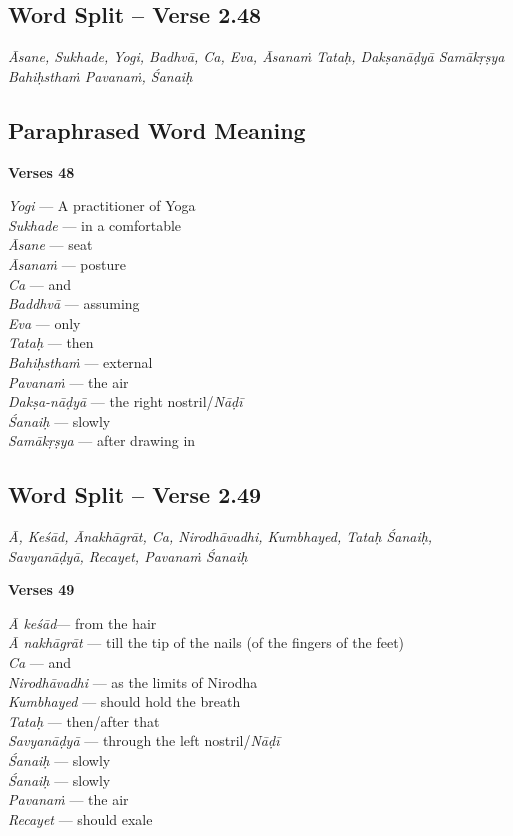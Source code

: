 \subsection*{Word Split -- Verse 2.48}

\textit{Āsane, Sukhade, Yogi, Badhvā, Ca, Eva, Āsanaṁ Tataḥ, Dakṣanāḍyā Samākṛṣya Bahiḥsthaṁ Pavanaṁ, Śanaiḥ}

\subsection*{Paraphrased Word Meaning}


\noindent \textbf{Verses 48}

\begin{multicols}{2}
\textit{Yogi} --- A practitioner of Yoga \\
\textit{Sukhade} --- in a comfortable \\
\textit{Āsane} --- seat \\
\textit{Āsanaṁ} --- posture  \\
\textit{Ca} --- and \\
\textit{Baddhvā} --- assuming\\
\textit{Eva} --- only\\
\textit{Tataḥ} --- then\\ 
\textit{Bahiḥsthaṁ} --- external\\
\textit{Pavanaṁ} --- the air \\
\textit{Dakṣa-nāḍyā} --- the right nostril/\textit{Nāḍī}\\
\textit{Śanaiḥ} --- slowly \\
\textit{Samākṛṣya} --- after drawing in
\end{multicols}

\subsection*{Word Split – Verse 2.49}

\textit{Ā, Keśād, Ānakhāgrāt, Ca, Nirodhāvadhi, Kumbhayed, Tataḥ Śanaiḥ, Savyanāḍyā, Recayet, Pavanaṁ Śanaiḥ}

\noindent \textbf{Verses 49}

\begin{multicols}{2}
\textit{Ā  keśād}--- from the hair \\
\textit{Ā nakhāgrāt} --- till the tip of the nails (of the fingers of the feet) \\
\textit{Ca}  --- and \\
\textit{Nirodhāvadhi} --- as the limits of Nirodha \\
\textit{Kumbhayed} --- should hold the breath\\
\textit{Tataḥ} --- then/after that \\
\textit{Savyanāḍyā} --- through the left nostril/\textit{Nāḍī} \\
\textit{Śanaiḥ} --- slowly \\
\textit{Śanaiḥ} --- slowly \\
\textit{Pavanaṁ} --- the air \\
\textit{Recayet} --- should exale 
\end{multicols}


